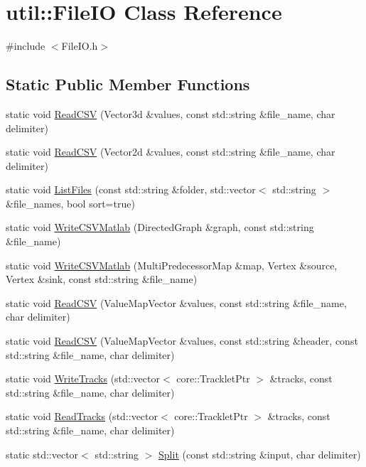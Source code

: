 \hypertarget{classutil_1_1FileIO}{}\section{util\+:\+:File\+IO Class Reference}
\label{classutil_1_1FileIO}


{\ttfamily \#include $<$File\+I\+O.\+h$>$}

\subsection*{Static Public Member Functions}
\begin{DoxyCompactItemize}
\item 
static void \hyperlink{classutil_1_1FileIO_ae31b9e693316483eda89df8463ea0d0a}{Read\+C\+SV} (Vector3d \&values, const std\+::string \&file\+\_\+name, char delimiter)
\item 
static void \hyperlink{classutil_1_1FileIO_a49f014af1e0f03d290f00049e082d9c6}{Read\+C\+SV} (Vector2d \&values, const std\+::string \&file\+\_\+name, char delimiter)
\item 
static void \hyperlink{classutil_1_1FileIO_a6e290e22083d49619b757bfca96a51fa}{List\+Files} (const std\+::string \&folder, std\+::vector$<$ std\+::string $>$ \&file\+\_\+names, bool sort=true)
\item 
static void \hyperlink{classutil_1_1FileIO_a5f2730a95e0801faa32e49dae9b86544}{Write\+C\+S\+V\+Matlab} (Directed\+Graph \&graph, const std\+::string \&file\+\_\+name)
\item 
static void \hyperlink{classutil_1_1FileIO_a2833554dcdf4a04f9fe67a324b5815ff}{Write\+C\+S\+V\+Matlab} (Multi\+Predecessor\+Map \&map, Vertex \&source, Vertex \&sink, const std\+::string \&file\+\_\+name)
\item 
static void \hyperlink{classutil_1_1FileIO_a642616eb6f07c71bd8dcb1585a532d92}{Read\+C\+SV} (Value\+Map\+Vector \&values, const std\+::string \&file\+\_\+name, char delimiter)
\item 
static void \hyperlink{classutil_1_1FileIO_a59b96733490d7b60e4f107da84efb245}{Read\+C\+SV} (Value\+Map\+Vector \&values, const std\+::string \&header, const std\+::string \&file\+\_\+name, char delimiter)
\item 
static void \hyperlink{classutil_1_1FileIO_a57059c9b52e86c753db5da6281cf23c6}{Write\+Tracks} (std\+::vector$<$ core\+::\+Tracklet\+Ptr $>$ \&tracks, const std\+::string \&file\+\_\+name, char delimiter)
\item 
static void \hyperlink{classutil_1_1FileIO_a82be787051876b0e3d3c4f887c3c27ce}{Read\+Tracks} (std\+::vector$<$ core\+::\+Tracklet\+Ptr $>$ \&tracks, const std\+::string \&file\+\_\+name, char delimiter)
\item 
static std\+::vector$<$ std\+::string $>$ \hyperlink{classutil_1_1FileIO_a925a74ff26782b8f64106579c9d54b47}{Split} (const std\+::string \&input, char delimiter)
\end{DoxyCompactItemize}



